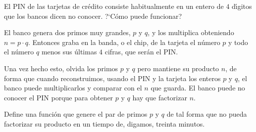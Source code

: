 \begin{ejer}

El PIN de las tarjetas de cr\'edito consiste habitualmente en un entero de $4$ 
d\'{\i}gitos que los bancos dicen no conocer. ?`C\'omo puede funcionar?

El banco genera dos primos muy grandes, $p$ y $q$, y los multiplica obteniendo 
$n=p\cdot q$.  Entonces graba en la banda, o el chip, de la tarjeta 
el n\'umero $p$ y todo el n\'umero $q$ menos sus \'ultimas $4$ cifras, que 
ser\'an el PIN. 

Una vez hecho esto, olvida los primos $p$ y $q$ pero mantiene su producto $n$, 
de forma que cuando reconstruimos, usando el PIN y la tarjeta los enteros $p$ y 
$q$, el banco puede multiplicarlos y comparar con el $n$ que guarda. El banco 
puede no conocer el PIN  porque para obtener $p$ y $q$ hay que factorizar $n$. 


Define una funci\'on que genere el par de primos $p$ y $q$ de tal forma que 
{\sage} no pueda factorizar su producto en un tiempo  de, digamos, treinta 
minutos. \end{ejer}

